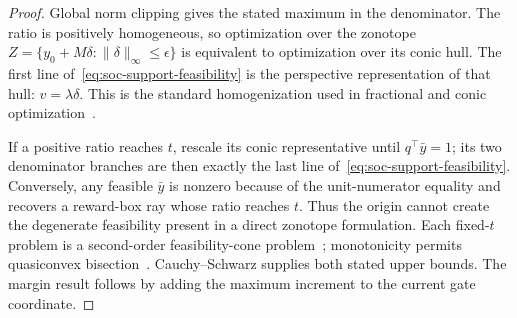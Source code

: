 \begin{proof}
Global norm clipping gives the stated maximum in the denominator.  The ratio
is positively homogeneous, so optimization over the zonotope
$Z=\{y_0+M\delta:\|\delta\|_\infty\le\epsilon\}$ is equivalent to optimization
over its conic hull.  The first line of~\eqref{eq:soc-support-feasibility} is
the perspective representation of that hull: $v=\lambda\delta$.  This is the
standard homogenization used in fractional and conic
optimization~\cite{schaible_fractional_duality_1976,bauschke_homogenization_2023}.

If a positive ratio reaches $t$, rescale its conic representative until
$q^\top\bar y=1$; its two denominator branches are then exactly the last line
of~\eqref{eq:soc-support-feasibility}.  Conversely, any feasible $\bar y$ is
nonzero because of the unit-numerator equality and recovers a reward-box ray
whose ratio reaches $t$.  Thus the origin cannot create the degenerate
feasibility present in a direct zonotope formulation.  Each fixed-$t$ problem
is a second-order feasibility-cone problem~\cite{belloni_soc_feasibility_2008};
monotonicity permits quasiconvex bisection~\cite{agrawal_dqcp_2020}.
Cauchy--Schwarz supplies both stated upper bounds.  The margin result follows
by adding the maximum increment to the current gate coordinate.
\end{proof}
